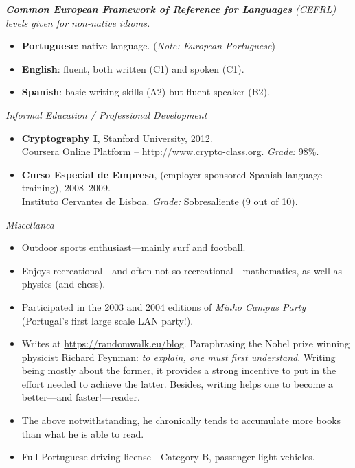 \documentclass[a4paper,10pt]{extarticle}
\newenvironment{topic}[1]
   {{\noindent\large\bfseries\raisebox{0pt}[\height][1ex]{#1}\hrule\par}%
    \begin{list}{}{%
       \setlength{\leftmargin}{.0cm}}\item[]}
   {\end{list}\medskip}
\begin{document}
\begin{topic}{Languages}
  {\hspace*{2em} \slshape \small \textbf{Common European Framework of Reference for Languages} 
	(\href{http://en.wikipedia.org/wiki/Common\_European\_Framework\_of\_Reference\_for\_Languages#Common\_reference\_levels}{CEFRL}) 
	levels given for non-native idioms.}
  \begin{itemize}[leftmargin=*]
    \item {\bfseries Portuguese}: native language. (\emph{Note: European Portuguese})
    \item {\bfseries English}: fluent, both written (C1) and spoken (C1).
    \item {\bfseries Spanish}: basic writing skills (A2) but fluent speaker (B2).
  \end{itemize}
\end{topic}

\begin{topic}{Additional Information}
  {\hspace*{2em} \itshape Informal Education / Professional Development}
  \begin{itemize}[leftmargin=*]
    \item {\bfseries Cryptography I}, Stanford University, 2012.\\
      Coursera Online Platform -- \url{http://www.crypto-class.org}. \emph{Grade:} 98\%.
    \item {\bfseries Curso Especial de Empresa}, (employer-sponsored Spanish language training), 2008--2009.\\
			Instituto Cervantes de Lisboa. \emph{Grade:} Sobresaliente (9 out of 10).
  \end{itemize}
  {\hspace*{2em} \itshape Miscellanea}  
  \begin{itemize}[leftmargin=*]
    \item{Outdoor sports enthusiast---mainly surf and football.}
    \item{Enjoys recreational---and often not-so-recreational---mathematics,
      as well as physics (and chess).}
    \item{Participated in the 2003 and 2004 editions of \emph{Minho Campus
			Party} (Portugal's first large scale LAN party!).}
		\item Writes at \url{https://randomwalk.eu/blog}. Paraphrasing the 
			Nobel prize winning physicist Richard Feynman: \emph{to explain, one must 
			first understand}. Writing being mostly about the former, it provides a 
			strong incentive to put in the effort needed to achieve the latter. 
			Besides, writing helps one to become a better---and faster!---reader.
    \item The above notwithstanding, he chronically tends to accumulate more books than 
      what he is able to read.
    \item{Full Portuguese driving license---Category B, passenger light
      vehicles.}
  \end{itemize}
\end{topic}
\end{document}
